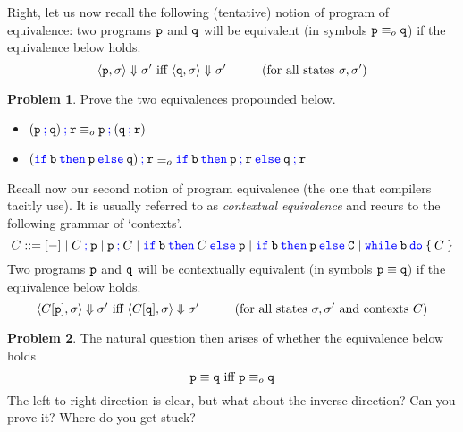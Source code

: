 \documentclass[a4paper, 11pt]{article}
\theoremstyle{definition}
\newtheorem{problem}{Problem}
\newcommand{\blue}[1]{\textcolor{blue}{#1}}
\begin{document}
Right, let us now recall the following (tentative) notion of program of
equivalence: two programs $\mathtt{p}$ and $\mathtt{q}$ will be equivalent (in
symbols $\mathtt{p} \equiv_o \mathtt{q}$) if the equivalence below holds.
       \[
                \langle \mathtt{p}, \sigma \rangle \Downarrow \sigma'
                \text{ iff } \langle \mathtt{q}, \sigma \rangle \Downarrow \sigma'
                \hspace{1cm} (\text{for all states } \sigma,\sigma')
       \]
\begin{problem}
        Prove the two equivalences propounded below.
        \begin{itemize}
                \item $\mathtt{(p \> \blue{ ;} \> q) \> {\blue ;} \> r} \equiv_o
                        \mathtt{p \> \blue{ ;} \> (q \> {\blue ;} \> r)}$
                \item $\mathtt{(\blue{ if} \> b \> \blue{ then} \> p \> \blue{ else} \> q) 
                      \> \blue{ ;} \> \prog{r}} \equiv_o 
                      \mathtt{\blue{ if} \> b \> \blue{ then} \> p \> \blue{ ;} \> r \> 
                      \blue{ else} \> q \> \blue{ ;} \> r}$ 
        \end{itemize}
\end{problem}

Recall now our second notion of program equivalence (the one that compilers
tacitly use). It is usually referred to as \emph{contextual equivalence} and
recurs to the following grammar of `contexts'.
\[              
                C ::= [-] \mid C \> \prog{ \blue{;}} \> \prog{p} 
                \mid 
                \prog{p} \> \prog{ \blue{;}} \> C 
                \mid 
                \mathtt{\blue{ if} \> b \> \blue{ then} \>} C \mathtt{\> \blue{ else} \> p} 
                \mid
                \mathtt{\blue{ if} \> b \> \blue{ then} \>} \prog{p} \mathtt{\> \blue{ else} \> C} 
                \mid
                \mathtt{\blue{ while} \> b \> \blue{ do} \> \{ \>} C \mathtt{\> \}}
\]
Two programs $\mathtt{p}$ and $\mathtt{q}$ will be contextually equivalent (in
symbols $\mathtt{p} \equiv \mathtt{q}$) if the equivalence below holds.
\[
               \langle C[\mathtt{p}], \sigma \rangle \Downarrow \sigma'
               \text{ iff } \langle C[\mathtt{q}], \sigma \rangle \Downarrow \sigma'
               \hspace{1cm} (\text{for all states } \sigma,\sigma' \text{ and contexts } C)
\]
\begin{problem}
        The natural question then arises of whether the equivalence below holds
        \[
                \mathtt{p} \equiv \mathtt{q} \text{ iff } \mathtt{p} \equiv_o \mathtt{q} 
        \]
        The left-to-right direction is clear, but what about the inverse direction?
        Can you prove it? Where do you get stuck?
\end{problem}
\end{document}
